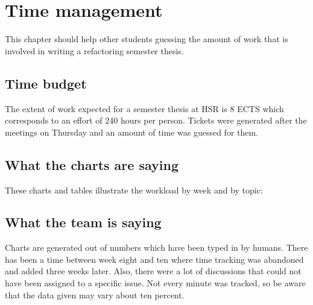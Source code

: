 \chapter{Time management}
\thispagestyle{fancy}
This chapter should help other students guessing the amount of work that is 
involved in writing a refactoring semester thesis.

\section{Time budget}
The extent of work expected for a semester thesis at HSR is 8 ECTS which 
corresponds to an effort of 240 hours per person. Tickets were generated after 
the meetings on Thursday and an amount of time was guessed for them. 

\section{What the charts are saying}
These charts and tables illustrate the workload by week and by topic:

\section{What the team is saying}
Charts are generated out of numbers which have been typed in by humans. There 
has been a time between week eight and ten where time tracking was abandoned and 
added three weeks later. Also, there were a lot of discussions that could not 
have been assigned to a specific issue. Not every minute was tracked, so be 
aware that the data given may vary about ten percent.
